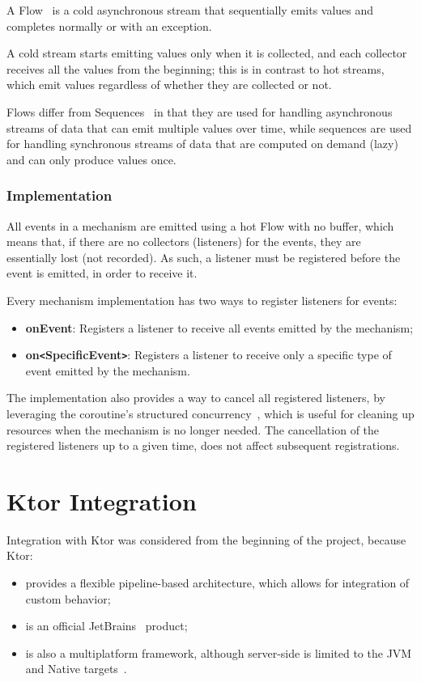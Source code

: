 A Flow~\cite{kotlin-flow} is a cold asynchronous stream that sequentially emits values and completes normally or with an exception.

A cold stream starts emitting values only when it is collected, and each collector receives all the values from the beginning; this is in contrast to hot streams, which emit values regardless of whether they are collected or not.

Flows differ from Sequences~\cite{kotlin-sequences} in that they are used for handling asynchronous streams of data that can emit multiple values over time, while sequences are used for handling synchronous streams of data that are computed on demand (lazy) and can only produce values once.

\subsubsection{Implementation}

All events in a mechanism are emitted using a hot Flow with no buffer, which means that, if there are no collectors (listeners) for the events, they are essentially lost (not recorded).
As such, a listener must be registered before the event is emitted, in order to receive it.

Every mechanism implementation has two ways to register listeners for events:

\begin{itemize}
    \item \textbf{onEvent}: Registers a listener to receive all events emitted by the mechanism;
    \item \textbf{on\texttt{<}SpecificEvent\texttt{>}}: Registers a listener to receive only a specific type of event emitted by the mechanism.
\end{itemize}

The implementation also provides a way to cancel all registered listeners, by leveraging the coroutine's structured concurrency~\cite{kotlin-coroutines}, which is useful for cleaning up resources when the mechanism is no longer needed.
The cancellation of the registered listeners up to a given time, does not affect subsequent registrations.

\section{Ktor Integration}\label{sec:ktor-integration}

Integration with Ktor was considered from the beginning of the project, because Ktor:
\begin{itemize}
    \item provides a flexible pipeline-based architecture, which allows for integration of custom behavior;
    \item is an official JetBrains~\cite{jetbrains} product;
    \item is also a multiplatform framework, although server-side is limited to the JVM and Native targets~\cite{ktor-server-platforms}.
\end{itemize}


